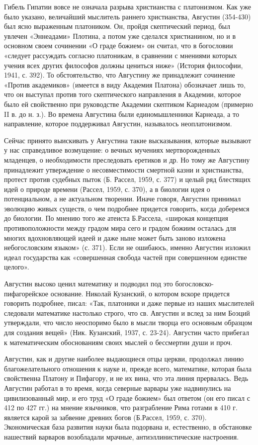 Гибель Гипатии вовсе не означала разрыва христианства с
платонизмом. Как уже было указано, величайший мыслитель раннего
христианства, Августин (354-430) был ясно выраженным платоником. Он,
пройдя скептический период, был увлечен «Эннеадами» Плотина, а потом
уже сделался христианином, но и в основном своем сочинении «О граде
божием» он считал, что в богословии «следует рассуждать согласно
платоникам, в сравнении с мнениями которых учения всех других
философов должны цениться ниже» (История философии, 1941, с. 392). То
обстоятельство, что Августину же принадлежит сочинение «Против
академиков» (имеется в виду Академия Платона) обозначает лишь то, что
он выступал против того скептического направления в Академии, которое
было ей свойственно при руководстве Академии скептиком Карнеадом
(примерно II в. до н. з.). Во времена Августина были единомышленники
Карнеада, а то направление, которое поддерживал Августин, называлось
неоплатонизмом.

Сейчас принято выискивать у Августина такие высказывания, которые
вызывают у нас справедливое возмущение: о вечных мучениях
мертворожденных младенцев, о необходимости преследовать еретиков и др.
Но тому же Августину принадлежит утверждение о несовместимости
смертной казни и христианства, протест против судебных пыток (Б.
Рассел, 1959, с. 377) и целый ряд блестящих идей о природе времени
(Рассел, 1959, с. 370), а в биологии идея о потенциальном, а не
актуальном творении. Иначе говоря, Августин принимал эволюцию живых
существ, о чем подробнее придется говорить, когда доберемся до
биологии. По мнению того же атеиста Б.Рассела, «широкая концепция
противоположности между градом мира сего и градом божиим осталась для
многих вдохновляющей идеей и даже ныне может быть заново изложена
небогословским языком» (с. 371). Если не ошибаюсь, именно Августин
изложил идеал государства как «совершенная свобода частей при
совершенном единстве целого».

Августин высоко ценил математику и подводил под это
богословско-пифагорейское основание. Николай Кузанский, о котором
вскоре придется говорить подробнее, писал: «Так, платоники и даже
первые из наших мыслителей следовали математике настолько строго, что
св. Августин и вслед за ним Боэций утверждали, что число неоспоримо
было в мысли творца его основным образцом для создания вещей» (Ник.
Кузанский, 1937, с. 23-24). Августин часто прибегал к математическим
обоснованиям своих мыслей о бессмертии души и проч.

Августин, как и другие наиболее выдающиеся отцы церкви, продолжал
линию благожелательного отношения к науке и, прежде всего, математике,
которая была свойственна Платону и Пифагору, и не их вина, что эта
линия прервалась. Ведь Августин работал в то время, когда северные
варвары уже надвинулись на цивилизованный мир, и его труд «О граде
божием» был ответом (он его писал с 412 по 427 гг.) на мнение
язычников, что разграбление Рима готами в 410 г. является карой за
забвение древних богов (Б.Рассел, 1959, с. 370). Экономическая база
развития науки была подорвана и, естественно, в обстановке нашествий
варваров возобладали мрачные, антиэллинистические настроения.

